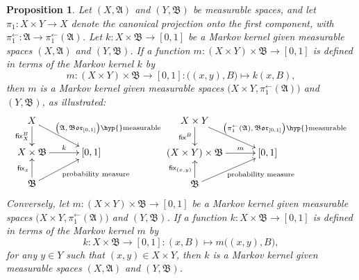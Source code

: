 \documentclass[
twoside=true,
paper=letter,
fontsize=11pt,
pagesize=auto,
leqno,
openany,
headsepline,
overfullrule,
]{scrbook}
\theoremstyle{plain}
\theoremstyle{plain}
\newtheorem{prop}[thm]{Proposition}
\theoremstyle{definition}
\theoremstyle{bfnoteitalic}
\theoremstyle{bfnoteroman}
\newcommand{\sigalg}[1]{\mathfrak{#1}}
\newcommand{\sfop}[1]{\mathsf{#1}}
\newcommand{\borel}{\mathfrak{Bor}}
\newcommand{\preimage}[1]{#1^{\leftarrow}}
\newcommand{\sigmaalgebra}{\sigalg{A}}
\newcommand{\sigmaalgebraii}{\sigalg{B}}
\newcommand{\measurespace}{X}
\newcommand{\measurespaceii}{Y}
\newcommand{\mspaceelt}{x}
\newcommand{\mspaceeltii}{y}
\newcommand{\setii}{B}
\newcommand{\projectionone}{\pi_1}
\newcommand{\markovkernel}{k}
\newcommand{\markovkernelii}{m}
\newcommand{\fixinthefirst}[1]{\sfop{fix}_{#1}}
\newcommand{\fixinthesecond}[1]{\sfop{fix}^{#1}}
\begin{document}
\begin{prop}\label{induced_markov_kernel}
Let $(\measurespace, \sigmaalgebra)$ and 
$(\measurespaceii, \sigmaalgebraii)$ be measurable spaces, 
and let 
$\projectionone: \measurespace\times\measurespaceii \to \measurespace$ denote the canonical projection onto the first component, with 
$\preimage\projectionone: 
\sigmaalgebra\to
\preimage{\projectionone}(\sigmaalgebra)$.
Let
$\markovkernel:\measurespace\times\sigmaalgebraii\to [0,1]$ 
be a Markov kernel given measurable spaces
$(\measurespace, \sigmaalgebra)$ and 
$(\measurespaceii, \sigmaalgebraii)$. If a function 
$\markovkernelii:
(\measurespace\times\measurespaceii) \times \sigmaalgebraii 
\to
[0,1]$
is defined in terms of the Markov kernel $\markovkernel$ by
\[
\markovkernelii:
(\measurespace\times\measurespaceii) \times \sigmaalgebraii 
\to
[0,1]
: 
\bigl((\mspaceelt,\mspaceeltii),\setii\bigr)\mapsto 
\markovkernel(\mspaceelt,\setii),
\]
then 
$\markovkernelii$ is a Markov kernel given measurable spaces
$\bigl(\measurespace\times\measurespaceii, \preimage\projectionone(\sigmaalgebra)\bigr)$
and
$(\measurespaceii, \sigmaalgebraii)$, as illustrated:
\[
\xymatrix@R=18pt@C=30pt{ 
\measurespace \ar[d]_-{\fixinthesecond{\setii}_\measurespace} 
\ar[dr]^{\qquad\text{ $\bigl(\sigmaalgebra, \borel_{[0,1]}\bigr)$\hyp{}measurable}}\\
\measurespace\times\sigmaalgebraii \ar[r]^-{\markovkernel} & [0,1] \\
\sigmaalgebraii 
\ar[ur]_{\qquad\text{probability measure}} \ar[u]^{\fixinthefirst{\mspaceelt}} & \\
}
%
\xymatrix@R=18pt@C=30pt{ 
\measurespace\times\measurespaceii 
\ar[d]_-{\fixinthesecond{\setii}}
\ar[dr]^{\qquad\text{\qquad$\bigl(\preimage\projectionone(\sigmaalgebra), \borel_{[0,1]}\bigr)$\hyp{}measurable}}\\
(\measurespace\times\measurespaceii)\times\sigmaalgebraii \ar[r]^-{\markovkernelii} & [0,1] \\
\sigmaalgebraii 
\ar[ur]_{\qquad\text{probability measure}} \ar[u]^{\fixinthefirst{(\mspaceelt,\mspaceeltii)}} & \\
}
\]
Conversely, let 
$\markovkernelii :(\measurespace\times\measurespaceii)
\times \sigmaalgebraii
\to [0,1]$ be a Markov kernel given measurable spaces
$\bigl(\measurespace\times\measurespaceii, \preimage\projectionone(\sigmaalgebra)\bigr)$
and
$(\measurespaceii, \sigmaalgebraii)$.
If a function 
$\markovkernel:
\measurespace\times \sigmaalgebraii 
\to
[0,1]$
is defined in terms of the Markov kernel $\markovkernelii$ by
\[
\markovkernel:
\measurespace\times \sigmaalgebraii 
\to
[0,1]
: 
(\mspaceelt,\setii)
\mapsto 
\markovkernelii\bigl((\mspaceelt,\mspaceeltii),\setii\bigr),
\]
for any $\mspaceeltii\in\measurespaceii$ such that
$(\mspaceelt, \mspaceeltii)\in\measurespace\times\measurespaceii$,
then $\markovkernel$
is a Markov kernel given measurable spaces
$(\measurespace, \sigmaalgebra)$ and 
$(\measurespaceii, \sigmaalgebraii)$.
\end{prop}
\end{document}
